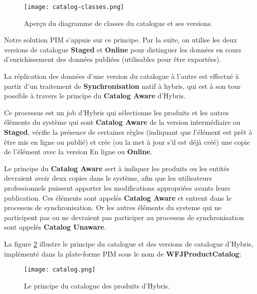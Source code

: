\begin{figure}[ht]
  \centering
  \texttt{[image: catalog-classes.png]}
  \caption{Aperçu du diagramme de classes du catalogue et ses versions.}
  \label{fig:classes-catalogue}
\end{figure}
\FloatBarrier


\medskip

Notre solution PIM s'appuie sur ce principe. Par la suite, on utilise les deux versions de catalogue \textbf{Staged} et \textbf{Online} pour distinguer les données en cours d'enrichissement des données publiées (utilisables pour être exportées).

\medskip

La réplication des données d'une version du catalogue à l'autre est effectué à partir d'un traitement de \textbf{Synchronisation} natif à hybris, qui est à son tour possible à travers le principe du \textbf{Catalog Aware} d'Hybris.

\medskip

Ce processus est un job d'Hybris qui sélectionne les produits et les autres éléments du système qui sont \textbf{Catalog Aware} de la version intermédiaire ou \textbf{Staged}, vérifie la présence de certaines règles (indiquant que l'élément est prêt à être mis en ligne ou publié) et crée (ou la met à jour s'il est déjà créé) une copie de l'élément avec la version En ligne ou \textbf{Online}.

\medskip

Le principe du \textbf{Catalog Aware} sert à indiquer les produits ou les entités devraient avoir deux copies dans le système, afin que les utilisateurs professionnels puissent apporter les modifications appropriées avants leurs publication. Ces éléments sont appelés \textbf{Catalog Aware} et entrent dans le processus de synchronisation. Or les autres éléments du systeme qui ne participent pas ou ne devraient pas participer au processus de synchronisation sont appelés \textbf{Catalog Unaware}.

\medskip

La figure \ref{fig:catalog} illustre le principe du catalogue et des versions de catalogue d'Hybris, implémenté dans la plate-forme PIM sous le nom de \textbf{WFJProductCatalog}:


\begin{figure}[ht]
  \centering
  \texttt{[image: catalog.png]}
  \caption{Le principe du catalogue des produits d'Hybris.}
  \label{fig:catalog}
\end{figure}
\FloatBarrier

